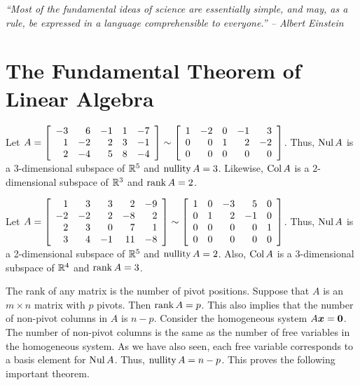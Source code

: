 \begin{center} 
\emph{``Most of the fundamental ideas of science are essentially simple, and may, as a rule, be expressed in a language comprehensible to everyone.'' -- Albert Einstein}
\end{center}

\section{The Fundamental Theorem of Linear Algebra}\label{sec:fundamental}
%
\begin{Exam}
\item Let $A = \mtx{rrrrr}{-3&6&-1&1&-7\\1&-2&2&3&-1\\2&-4&5&8&-4}\sim \mtx{rrrrr}{1&-2&0&-1&3\\0&0&1&2&-2\\0&0&0&0&0}$. Thus, $\nul A$ is a 3-dimensional subspace of $\R^5$ and $\nullity A = 3$. Likewise, $\col A$ is a $2$-dimensional subspace of $\R^3$ and $\rank A = 2$.
\end{Exam}\vs

\begin{Exam}
\item Let $A = \mtx{rrrrr}{1&3&3&2&-9\\-2&-2&2&-8&2\\2&3&0&7&1\\3&4&-1&11&-8}\sim \mtx{rrrrr}{1&0&-3&5&0\\0&1&2&-1&0\\0&0&0&0&1\\0&0&0&0&0}$. Thus, $\nul A$ is a 2-dimensional subspace of $\R^5$ and $\nullity A = 2$. Also, $\col A$ is a 3-dimensional subspace of $\R^4$ and $\rank A = 3$. 
\end{Exam}\vs

The rank of any matrix is the number of pivot positions. Suppose that $A$ is an $m\times n$ matrix with $p$ pivots. Then $\rank A = p$. This also implies that the number of non-pivot columns in $A$ is $n-p$. Consider the homogeneous system $A\bb x = \bb 0$. The number of non-pivot columns is the same as the number of free variables in the homogeneous system. As we have also seen, each free variable corresponds to a basis element for $\nul A$. Thus, $\nullity A = n-p$. This proves the following important theorem.\\

